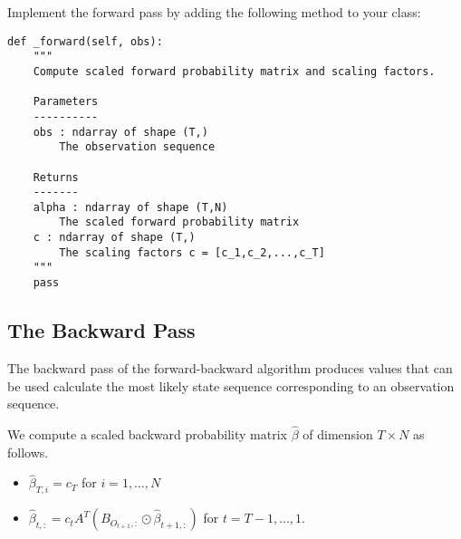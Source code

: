 \begin{problem}
Implement the forward pass by adding the following method to your class:
\begin{lstlisting}
def _forward(self, obs):
    """
    Compute scaled forward probability matrix and scaling factors.
    
    Parameters
    ----------
    obs : ndarray of shape (T,)
        The observation sequence
    
    Returns
    -------
    alpha : ndarray of shape (T,N)
        The scaled forward probability matrix
    c : ndarray of shape (T,)
        The scaling factors c = [c_1,c_2,...,c_T]
    """
    pass
\end{lstlisting}
\end{problem}

\subsection*{The Backward Pass}
The backward pass of the forward-backward algorithm produces values that can be used calculate the most likely state sequence corresponding to an observation sequence.
\begin{comment}
We also define the \emph{backward probabilities} $\beta_{t}(i)$ to be the probability of the partial observation sequence after time $t$, conditioned on the model parameters $\lambda$ and the event that the system is in state $i$ at time $t$, i.e.
\begin{equation*}
\beta_{t}(i) = \mathbb{P}(O_{t+1},\cdots,O_{T} | \mathbf{x}_{t} = i, \lambda)
\end{equation*}
The backward probabilities $\beta_{t}(i)$ can be computed recursively as well, as follows:
\begin{itemize}
 \item $\beta_{T}(i) = 1$
 \item $\beta_{t}(i) = \sum_{j=1}^{N} a_{ij}b_{jO_{t+1}}\beta_{t+1}(j)$ for $t = T-1, \cdots, 1$.
\end{itemize}
\end{comment}
We compute a scaled backward probability matrix $\widehat{\beta}$ of dimension $T \times N$ as follows.
\begin{itemize}
 \item $\widehat{\beta}_{T,i} = c_{T}$ for $i = 1,\ldots, N$
 \item $\widehat{\beta}_{t,:} = c_{t}A^T(B_{O_{t+1},:}\odot \widehat{\beta}_{t+1,:})$ for $t = T-1, \ldots, 1$.
\end{itemize}

